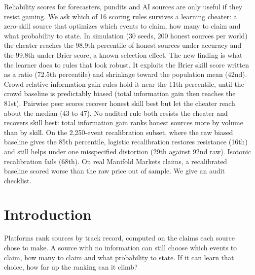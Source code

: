 \documentclass[10pt]{article}
\begin{document}
\apartAuthors

\begin{apartAbstract}
Reliability scores for forecasters, pundits and AI sources are only useful if they resist gaming. We ask which of 16 scoring rules survives a learning cheater: a zero-skill source that optimizes which events to claim, how many to claim and what probability to state. In simulation (30 seeds, 200 honest sources per world) the cheater reaches the 98.9th percentile of honest sources under accuracy and the 99.8th under Brier score, a known selection effect. The new finding is what the learner does to rules that look robust. It exploits the Brier skill score written as a ratio (72.5th percentile) and shrinkage toward the population mean (42nd). Crowd-relative information-gain rules hold it near the 11th percentile, until the crowd baseline is predictably biased (total information gain then reaches the 81st). Pairwise peer scores recover honest skill best but let the cheater reach about the median (43 to 47). No audited rule both resists the cheater and recovers skill best: total information gain ranks honest sources more by volume than by skill. On the 2,250-event recalibration subset, where the raw biased baseline gives the 85th percentile, logistic recalibration restores resistance (16th) and still helps under one misspecified distortion (29th against 92nd raw). Isotonic recalibration fails (68th). On real Manifold Markets claims, a recalibrated baseline scored worse than the raw price out of sample. We give an audit checklist.
\end{apartAbstract}

\section{Introduction}
Platforms rank sources by track record, computed on the claims each source chose to make. A source with no information can still choose which events to claim, how many to claim and what probability to state. If it can learn that choice, how far up the ranking can it climb?
\end{document}
